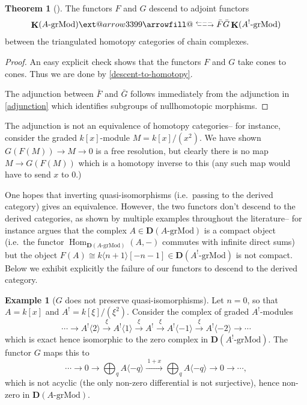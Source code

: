 \documentclass[a4paper]{article}
\makeatletter
\theoremstyle{definition}
\newtheorem{theorem}[defn]{Theorem}
\newtheorem{example}[defn]{Example}
\theoremstyle{remark}
\newcommand{\leftrarrows}{\mathrel{\raise.75ex\hbox{\oalign{%
  $\scriptstyle\leftarrow$\cr
  \vrule width0pt height.5ex$\hfil\scriptstyle\relbar$\cr}}}}
\newcommand{\lrightarrows}{\mathrel{\raise.75ex\hbox{\oalign{%
  $\scriptstyle\relbar$\hfil\cr
  $\scriptstyle\vrule width0pt height.5ex\smash\rightarrow$\cr}}}}
\newcommand{\Rrelbar}{\mathrel{\raise.75ex\hbox{\oalign{%
  $\scriptstyle\relbar$\cr
  \vrule width0pt height.5ex$\scriptstyle\relbar$}}}}
\def\leftrightarrowsfill@{\arrowfill@\leftrarrows\Rrelbar\lrightarrows}
\newcommand{\xleftrightarrows}[2][]{\ext@arrow 3399\leftrightarrowsfill@{#1}{#2}}
\newcommand{\grMod}{\ensuremath{\text{-grMod}}}
\DeclareMathOperator{\Hom}{\text{Hom}}
\DeclareMathOperator{\kom}{{\mathbf{K}}}
\newcommand{\deri}{\mathbf{D}}
\makeatother
\begin{document}
\begin{theorem}[\cite{eisenbud_sheaf_2003}]
    The functors \(F\) and \(G\) descend to adjoint functors
    \[ \kom(A\grMod) \xleftrightarrows[\bar F]{\bar G} \kom(A^!\grMod)\]
    between the triangulated homotopy categories of chain complexes.
    \begin{proof}
        An easy explicit check shows that the functors \(F\) and \(G\) take
        cones to cones. Thus we are done by \cref{descent-to-homotopy}.

        The adjunction between \(\bar F\) and \(\bar G\) follows immediately
        from the adjunction in \cref{adjunction} which identifies
        subgroups of nullhomotopic morphisms.
    \end{proof}
\end{theorem}

The adjunction is not an equivalence of homotopy categories-- for instance,
consider the graded \(k[x]\)-module \(M=k[x]/(x^2)\). We have shown
\(G(F(M))\rightarrow M\rightarrow 0\) is a free resolution, but clearly there is
no map \(M\rightarrow G(F(M))\) which is a homotopy inverse to this (any such map
would have to send \(x\) to \(0\).) 

One hopes that inverting quasi-isomorphisms (i.e.\ passing to the derived category) gives an equivalence.  However, the two functors don't descend to the derived categories, as shown by
multiple examples throughout the literature-- for instance
\cite{keller_koszul_2003} argues that the complex \(A\in \deri(A\grMod)\) is a
compact object (i.e.\ the functor \(\Hom_{\deri(A\grMod)}(A,-)\) commutes with
infinite direct sums) but the object \(F(A)\cong k\langle n+1 \rangle[-n-1]\in
\deri(A^!\grMod)\) is not compact. Below we exhibit explicitly the failure of
our functors to descend to the derived category.

\begin{example}[\(G\) does not preserve quasi-isomorphisms] Let \(n=0\), so that
    \(A=k[x]\) and \({A^!=k[\xi]/(\xi^2)}\). Consider the complex of
    graded \(A^!\)-modules 
    \[\cdots \rightarrow A^!\langle 2 \rangle \xrightarrow{\;\xi\;} A^!\langle 1
    \rangle \xrightarrow{\;\xi\;}  A^!\xrightarrow{\;\xi\;} A^!\langle -1 \rangle
    \xrightarrow{\;\xi\;} A^!\langle -2 \rangle \rightarrow \cdots\]
    which is exact hence isomorphic to the zero complex in \(\deri(A^!\grMod)\).
    The functor \(G\) maps this to 
    \[\cdots \rightarrow 0 \rightarrow \bigoplus_q A\langle -q \rangle
    \xrightarrow{\;1+x\;} \bigoplus_q A\langle -q \rangle \rightarrow 0
    \rightarrow \cdots, \]
    which is not acyclic (the only non-zero differential is not surjective),
    hence non-zero in \(\deri(A\grMod)\).  
\end{example}
\end{document}

